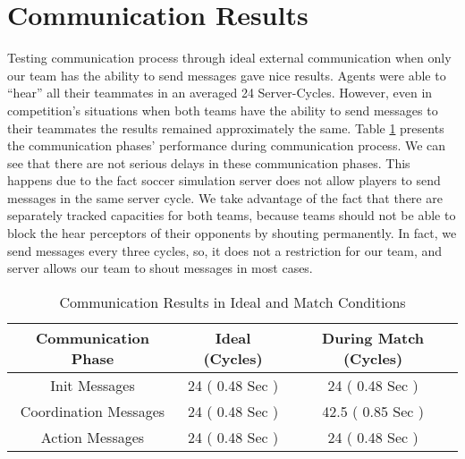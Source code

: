 \section{Communication Results}
Testing communication process through ideal external communication when only our team has the ability to send messages gave nice results. Agents were able to ``hear'' all their teammates in an averaged 24 Server-Cycles. However, even in competition's situations when both teams have the ability to send messages to their teammates the results remained approximately the same. Table \ref{CommunicationResults} presents the communication phases' performance during communication process. We can see that there are not serious delays in these communication phases. This happens due to the fact soccer simulation server does not allow players to send messages in the same server cycle. We take advantage of the fact that there are separately tracked capacities for both teams, because teams should not be able to block the hear perceptors of their opponents by shouting permanently. In fact, we send  messages every three cycles, so, it does not a restriction for our team, and server allows our team to shout messages in most cases.

\begin{table}
\begin{center}
    \begin{tabular}{ccc}
    \textbf{Communication Phase} 	& \textbf{Ideal} (Cycles) 			& \textbf{During Match} (Cycles) \\
    \midrule
    Init Messages 					& 24  ( 0.48 Sec ) 			& 24 	( 0.48 Sec )		\\
    Coordination Messages			& 24  ( 0.48 Sec )			& 42.5  ( 0.85 Sec )		\\
    Action Messages 				    & 24  ( 0.48 Sec )			& 24 ( 0.48 Sec )	 		\\
    \end{tabular}
\end{center}
\label{CommunicationResults}
\caption{Communication Results in Ideal and Match Conditions}
\end{table}



